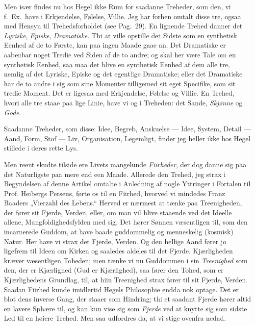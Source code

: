 \documentclass[12pt,a4paper]{book}
\newcommand{\apage}[1]{\marginnote{\footnotesize\textit{[#1]}}}
\begin{document}
Men især findes nu hos Hegel ikke Rum for saadanne Treheder, som den, vi f.\
Ex.\ have i Erkjendelse, Følelse, Villie. Jeg har forhen omtalt disse tre,
ogsaa med Hensyn til Trehedsforholdet (see Pag.\ 29). En lignende Trehed danner
det \emph{Lyriske}, \emph{Episke}, \emph{Dramatiske}. Thi at ville opstille det Sidste som en
synthetisk Eenhed af de to Første, kan paa ingen Maade gaae an. Det Dramatiske
er aabenbar noget Tredie ved Siden af de to andre; og skal her være Tale om en
synthetisk Eenhed, saa maa det blive en synthetisk Eenhed af dem alle \apage{132} tre,
nemlig af det Lyriske, Episke og det egentlige Dramatiske; eller det Dramatiske
har de to andre i sig som sine Momenter tilligemed sit eget Specifike, som sit
tredie Moment. Det er ligesaa med Erkjendelse, Følelse og Villie. En Trehed,
hvori alle tre staae paa lige Linie, have vi og i Treheden: det Sande, \emph{Skjønne}
og \emph{Gode}.

Saadanne Treheder, som disse: Idee, Begreb, Anskuelse --- Idee, System, Detail
--- Aand, Form, Stof --- Liv, Organisation, Legemligt, finder jeg heller ikke
hos Hegel stillede i deres rette Lys.

%
Men reent skudte tilside ere Livets mangelunde \emph{Fiirheder}, der dog danne sig paa
det Naturligste paa mere end een Maade. Allerede den Trehed, jeg strax i
Begyndelsen af denne Artikel omtalte i Anledning af nogle Yttringer i Fortalen
til Prof. Heibergs Perseus, førte os til en Fiirhed, hvorved vi mindedes Franz
Baaders „Vierzahl des Lebens.“ Herved er nærmest at tænke paa Treenigheden, der
fører sit Fjerde, Verden, eller, om man vil blive staaende ved det Ideelle
allene, Mangfoldighedsfylden med sig. Det hører Sønnen væsentligen til, som den
incarnerede Guddom, at have baade guddommelig og menneskelig (kosmisk) Natur.
Her have vi strax det Fjerde, Verden. Og den hellige Aand fører jo ligefrem til
Ideen om Kirken og saaledes aldeles til det Fjerde. Kjærligheden kræver
væsentligen Toheden; men tænke vi nu Guddommen i sin \emph{Treenighed} som den, der er
Kjærlighed (Gud er Kjærlighed), saa fører den Tohed, som er Kjærlighedens
Grundlag, til, at hiin Treenighed strax fører til sit Fjerde, Verden. Saadan
Fiirhed kunde imidlertid Hegels Philosophie endda nok optage. Det er blot dens
inverse Gang, der staaer som Hindring; thi et saadant Fjerde hører altid en
lavere Sphære til, og kan kun vise sig som \emph{Fjerde} ved at knytte sig som sidste
Led til en høiere Trehed. Men saa udfordres da, at vi stige ovenfra nedad.
\end{document}
